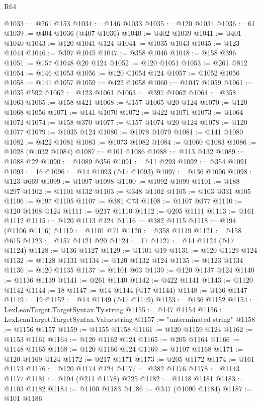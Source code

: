 \begin{lexlean}{R64}
\begin{coremodule}
@1033 := @261 @153
@1034 := @146 @1033
@1035 := @120 @1034
@1036 := 61
@1039 := @404 @1036 (@407 @1036)
@1040 := @402 @1039
@1041 := @401 @1040
@1043 := @120 @1041 @124
@1044 := @1035 @1043
@1045 := @123 @1044
@1046 := @397 @1045
@1047 := @358 @1046
@1048 := @158 @396
@1051 := @157 @1048 @20 @124
@1052 := @120 @1051
@1053 := @261 @812
@1054 := @146 @1053
@1056 := @120 @1054 @124
@1057 := @1052 @1056
@1058 := @141 @1057
@1059 := @422 @1058
@1060 := @1047 @1059
@1061 := @1035 @592
@1062 := @123 @1061
@1063 := @397 @1062
@1064 := @358 @1063
@1065 := @158 @421
@1068 := @157 @1065 @20 @124
@1070 := @120 @1068 @1056
@1071 := @141 @1070
@1072 := @422 @1071
@1073 := @1064 @1072
@1074 := @158 @370
@1077 := @157 @1074 @20 @124
@1078 := @120 @1077
@1079 := @1035 @124
@1080 := @1078 @1079
@1081 := @141 @1080
@1082 := @422 @1081
@1083 := @1073 @1082
@1084 := @1060 @1083
@1086 := @1028 (@1032 @1084)
@1087 := @101 @1086
@1088 := @113 @132
@1089 := @1088 @22
@1090 := @1089 @356
@1091 := @11 @293
@1092 := @354 @1091
@1093 := 16
@1096 := @14 @1093 (@17 @1093)
@1097 := @136 @1096
@1098 := @123 @669
@1099 := @1097 @1098
@1100 := @1092 @1099
@1101 := @188 @297
@1102 := @1101 @132
@1103 := @348 @1102
@1105 := @103 @331 @105
@1106 := @197 @1105
@1107 := @381 @73
@1108 := @1107 @377
@1110 := @120 @1108 @124
@1111 := @217 @1110
@1112 := @205 @1111
@1113 := @161 @1112
@1115 := @120 @1113 @124
@1116 := @382 @1115
@1118 := @194 (@1106 @1116)
@1119 := @1101 @71
@1120 := @358 @1119
@1121 := @158 @615
@1123 := @157 @1121 @20
@1124 := 17
@1127 := @14 @1124 (@17 @1124)
@1128 := @136 @1127
@1129 := @1101 @19
@1131 := @120 @1129 @124
@1132 := @1128 @1131
@1134 := @120 @1132 @124
@1135 := @1123 @1134
@1136 := @120 @1135
@1137 := @1101 @63
@1139 := @120 @1137 @124
@1140 := @1136 @1139
@1141 := @261 @1140
@1142 := @422 @1141
@1143 := @1120 @1142
@1144 := 18
@1147 := @14 @1144 (@17 @1144)
@1148 := @136 @1147
@1149 := 19
@1152 := @14 @1149 (@17 @1149)
@1153 := @136 @1152
@1154 := LexLeanTarget.TargetSyntax.Ty.string
@1155 := @147 @1154
@1156 := LexLeanTarget.TargetSyntax.Value.string
@1157 := "unterminated string"
@1158 := @1156 @1157
@1159 := @1155 @1158
@1161 := @120 @1159 @124
@1162 := @1153 @1161
@1164 := @120 @1162 @124
@1165 := @205 @1164
@1166 := @1148 @1165
@1168 := @120 @1166 @124
@1169 := @1107 @1168
@1171 := @120 @1169 @124
@1172 := @217 @1171
@1173 := @205 @1172
@1174 := @161 @1173
@1176 := @120 @1174 @124
@1177 := @382 @1176
@1178 := @1143 @1177
@1181 := @194 (@211 @1178) @225
@1182 := @1118 @1181
@1183 := @1103 @1182
@1184 := @1100 @1183
@1186 := @347 (@1090 @1184)
@1187 := @101 @1186

\end{coremodule}
\end{lexlean}
